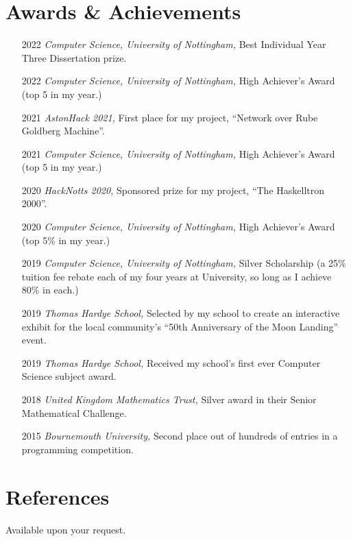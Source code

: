 \documentclass[12pt]{article}
\begin{document}
\section*{Awards \& Achievements}
\begin{itemize}
	\item[2022] \textit{Computer Science, University of Nottingham,} Best Individual Year Three Dissertation prize.
	\item[2022] \textit{Computer Science, University of Nottingham,} High Achiever's Award (top 5 in my year.)
	\item[2021] \textit{AstonHack 2021,} First place for my project, ``Network over Rube Goldberg Machine''.
	\item[2021] \textit{Computer Science, University of Nottingham,} High Achiever's Award (top 5 in my year.)
	\item[2020] \textit{HackNotts 2020,} Sponsored prize for my project, ``The Haskelltron 2000''.
	\item[2020] \textit{Computer Science, University of Nottingham,} High Achiever's Award (top 5\% in my year.)
	\item[2019] \textit{Computer Science, University of Nottingham,} Silver Scholarship (a 25\% tuition fee rebate each of my four years at University, so long as I achieve 80\% in each.)
	\item[2019] \textit{Thomas Hardye School,} Selected by my school to create an interactive exhibit for the local community's ``50th Anniversary of the Moon Landing'' event.
	\item[2019] \textit{Thomas Hardye School,} Received my school's first ever Computer Science subject award.
	\item[2018] \textit{United Kingdom Mathematics Trust,} Silver award in their Senior Mathematical Challenge.
	\item[2015] \textit{Bournemouth University,} Second place out of hundreds of entries in a programming competition.
\end{itemize}

\section*{References}
Available upon your request.
\end{document}
